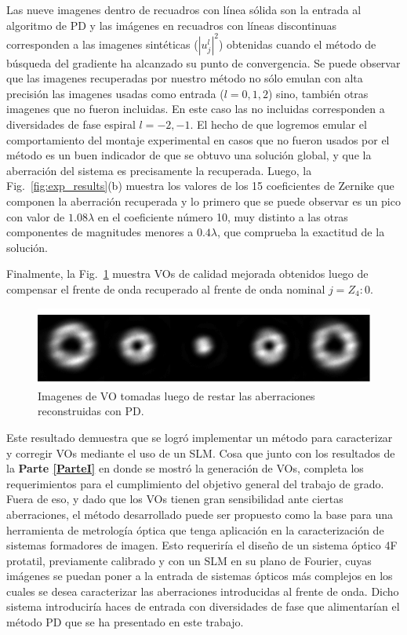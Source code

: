 Las nueve imagenes dentro de recuadros con línea sólida son la
entrada al algoritmo de PD y las imágenes en recuadros con líneas
discontinuas corresponden a las imagenes sintéticas ($|u_j^l|^2$) obtenidas
cuando el método de búsqueda del gradiente ha alcanzado su punto de 
convergencia. Se puede observar que las imagenes
recuperadas por nuestro método no sólo emulan con alta precisión las
imagenes usadas como entrada ($l=0,1,2$) sino, también otras imagenes que no
fueron incluidas. En este caso las no incluidas corresponden a
diversidades de fase espiral $l=-2,-1$. El hecho de que logremos emular el comportamiento
del montaje experimental en casos que no fueron usados por el método
es un buen indicador de que se obtuvo una solución global, y que la
aberración del sistema es precisamente la recuperada. Luego, la
Fig.~\ref{fig:exp_results}(b) muestra los valores de los 15
coeficientes de 
Zernike que componen la aberración recuperada y lo primero que se puede
observar es un pico con valor de  $1.08\lambda$ en el coeficiente
número 10, muy distinto a las otras componentes de magnitudes menores
a $0.4\lambda$, que comprueba la exactitud de la solución.   

Finalmente, la Fig.~\ref{fig:exp_correction} muestra VOs de calidad mejorada obtenidos
luego de compensar el frente de onda recuperado al frente de
onda nominal $j = Z_4:0$.  

\begin{figure}[h!]
\centering
\includegraphics[scale=1.5]{PSF_comparison_experimental_results_07032015.pdf}
\caption[VO registrados luego restar las aberraciones detectadas
  con PD.]{Imagenes de VO tomadas luego de restar las aberraciones
    reconstruidas con PD.}  
\label{fig:exp_correction}
\end{figure}

Este resultado demuestra que se logró implementar un método para
caracterizar y corregir VOs mediante el uso de un SLM.  Cosa que junto
con los resultados de la \textbf{Parte \ref{ParteI}} en donde se
mostró la generación de VOs, completa los
requerimientos para el cumplimiento del objetivo general del trabajo
de grado. Fuera de eso, y dado que los VOs tienen gran sensibilidad ante ciertas
aberraciones, el método desarrollado puede ser propuesto como la base
para una herramienta de metrología óptica que tenga aplicación en la caracterización de sistemas
formadores de imagen. Esto requeriría el diseño de un sistema óptico 4F
protatil, previamente calibrado y con un SLM en su plano de Fourier, cuyas imágenes se puedan
poner a la entrada de sistemas ópticos más complejos en los cuales se
desea caracterizar las aberraciones introducidas al frente de
onda. Dicho sistema introduciría haces de entrada con diversidades de
fase que alimentarían el método PD que se ha presentado en este
trabajo. 

